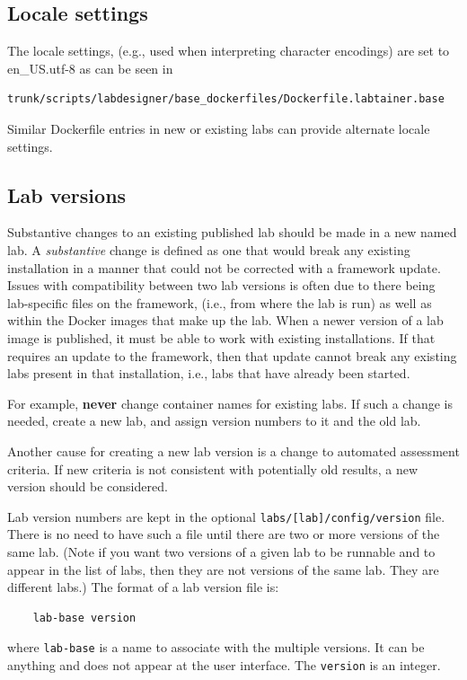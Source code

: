 \documentclass[12pt]{article}
\begin{document}
\subsection{Locale settings}
The locale settings, (e.g., used when interpreting character encodings) are set to en\_US.utf-8 
as can be seen in 
\begin{verbatim}
trunk/scripts/labdesigner/base_dockerfiles/Dockerfile.labtainer.base
\end{verbatim}
Similar Dockerfile entries in new or existing labs can provide alternate locale settings.

\subsection{Lab versions}
Substantive changes to an existing published lab should be made in
a new named lab.  A \textit{substantive} change is defined as one that would
break any existing installation in a manner that could not be corrected
with a framework update.  Issues with compatibility between two
lab versions is often due to there being lab-specific files on the framework,
(i.e., from where the lab is run) as well as within the Docker images that
make up the lab.  When a newer version of a lab image is published, it must 
be able to work with existing installations.  If that requires an update to the
framework, then that update cannot break any existing labs present in that
installation, i.e., labs that have already been started.

For example, \textbf{never} change container names for existing labs.  If such
a change is needed, create a new lab, and assign version numbers to
it and the old lab.  

Another cause for creating a new lab version is a change to automated assessment
criteria.  If new criteria is not consistent with potentially old results, a new
version should be considered.

Lab version numbers are kept in the optional {\tt labs/[lab]/config/version} file.
There is no need to have such a file until there are two or more versions of the
same lab.  (Note if you want two versions of a given lab to be runnable and to appear
in the list of labs, then they are not versions of the same lab.  They are different
labs.)  The format of a lab version file is:
\begin{verbatim}
    lab-base version
\end{verbatim}
where {\tt lab-base} is a name to associate with the multiple versions.  It can be
anything and does not appear at the user interface.  The {\tt version} is an integer.
\end{document}
